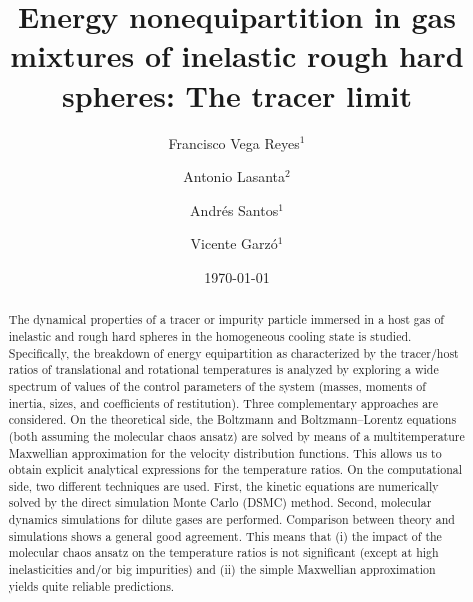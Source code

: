 \documentclass[aps,pre,reprint]{revtex4-1}
\begin{document}
\title{Energy nonequipartition in  gas mixtures  of inelastic rough hard spheres: The tracer limit}


\author{Francisco Vega Reyes$^{1}$}
\author{Antonio Lasanta$^{2}$}
\author{Andr\'es Santos$^{1}$}
\author{Vicente Garz\'o$^{1}$}

\begin{abstract}
The dynamical properties of a tracer or impurity particle immersed in a host gas of inelastic and rough hard spheres in the homogeneous cooling state is studied. Specifically, the breakdown of energy equipartition  as characterized by the tracer/host ratios of translational and rotational temperatures is analyzed by exploring a wide spectrum of values of the control parameters of the system (masses, moments of inertia, sizes, and coefficients of restitution). Three complementary approaches are considered. On the theoretical side, the Boltzmann and Boltzmann--Lorentz equations (both assuming the molecular chaos ansatz) are  solved by means of a multitemperature Maxwellian approximation for the velocity distribution functions. This allows us to obtain explicit analytical expressions for the temperature ratios. On the computational side, two different techniques are used. First, the  kinetic equations are numerically solved by the direct simulation Monte Carlo  (DSMC) method.  Second, molecular dynamics simulations for dilute gases are performed. Comparison between theory and simulations shows a general good agreement. This means that (i) the impact of the molecular chaos ansatz on the temperature ratios is not significant (except at high inelasticities and/or big impurities) and (ii) the simple Maxwellian approximation yields quite reliable predictions.
\end{abstract}


\date{\today}
\maketitle
\end{document}
